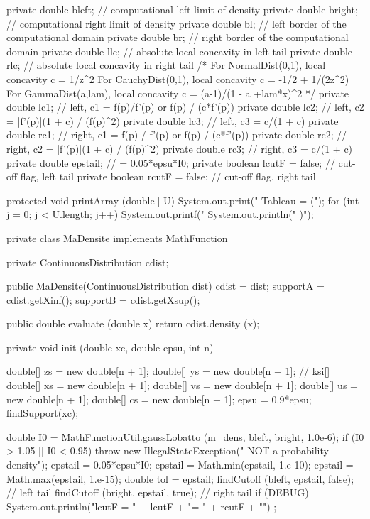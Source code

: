 \begin{code}
\begin{hide}
{   private double bleft;      // computational left limit of density
   private double bright;     // computational right limit of density
   private double bl;         // left border of the computational domain
   private double br;         // right border of the computational domain
   private double llc;        // absolute local concavity in left tail
   private double rlc;        // absolute local concavity in right tail
/*
   For NormalDist(0,1), local concavity c = 1/z^2
   For CauchyDist(0,1), local concavity c = -1/2 + 1/(2z^2)
   For GammaDist(a,lam), local concavity c = (a-1)/(1 - a +lam*x)^2
*/
   private double lc1;        // left, c1 = f(p)/f'(p) or f(p) / (c*f'(p))
   private double lc2;        // left, c2 = |f'(p)|(1 + c) / (f(p)^2)
   private double lc3;        // left, c3 = c/(1 + c)
   private double rc1;        // right, c1 = f(p) / f'(p) or f(p) / (c*f'(p))
   private double rc2;        // right, c2 = |f'(p)|(1 + c) / (f(p)^2)
   private double rc3;        // right, c3 = c/(1 + c)
   private double epstail;    // = 0.05*epsu*I0;
   private boolean lcutF = false;    // cut-off flag, left tail
   private boolean rcutF = false;   // cut-off flag, right tail


   protected void printArray (double[] U) {
      System.out.print("      Tableau = (");
      for (int j = 0; j < U.length; j++)
         System.out.printf("  %
      System.out.println("  )");
   }


   private class MaDensite implements MathFunction {
      private ContinuousDistribution cdist;

      public MaDensite(ContinuousDistribution dist) {
         cdist = dist;
         supportA = cdist.getXinf();
         supportB = cdist.getXsup();
     }

      public double evaluate (double x) {
         return cdist.density (x);
      }
   }


   private void init (double xc, double epsu, int n) {
      double[] zs = new double[n + 1];
      double[] ys = new double[n + 1];   // ksi[]
      double[] xs = new double[n + 1];
      double[] vs = new double[n + 1];
      double[] us = new double[n + 1];
      double[] cs = new double[n + 1];
      epsu = 0.9*epsu;
      findSupport(xc);

      double I0 = MathFunctionUtil.gaussLobatto (m_dens, bleft, bright, 1.0e-6);
      if (I0 > 1.05 || I0 < 0.95)
         throw new IllegalStateException("  NOT a probability density");
      epstail = 0.05*epsu*I0;
      epstail = Math.min(epstail, 1.e-10);
      epstail = Math.max(epstail, 1.e-15);
      double tol = epstail;
      findCutoff (bleft, epstail, false);    // left tail
      findCutoff (bright, epstail, true);    // right tail
      if (DEBUG)
         System.out.println("lcutF = " + lcutF + "\nrcutF = " + rcutF + "\n") ;

}}
\end{hide}
\end{code}
